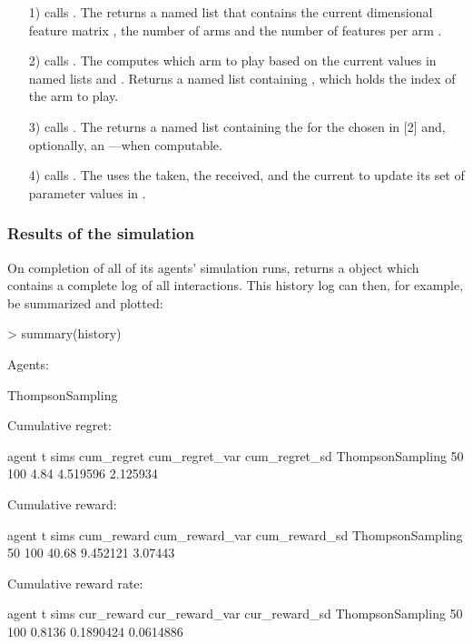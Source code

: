 \documentclass{jss}
\begin{document}
\begin{enumerate}
         \item[1)]  calls . The  returns a named list that contains the current  dimensional feature matrix , the number of arms  and the number of features per arm .
         \item[2)]  calls . The  computes which arm to play based on the current values in named lists  and . Returns a named list containing , which holds the index of the arm to play.
         \item[3)]  calls . The  returns a named list containing the  for the  chosen in [2] and, optionally, an ---when computable.
         \item[4)]  calls . The  uses the  taken, the  received, and the current  to update its set of parameter values in .
\end{enumerate}

\subsubsection{Results of the simulation}

On completion of all of its agents' simulation runs,  returns a  object which contains a complete log of all interactions. This history log can then, for example, be summarized and plotted:

\begin{CodeChunk}
\begin{CodeInput}
> summary(history)
\end{CodeInput}
\begin{CodeOutput}
Agents:

  ThompsonSampling

Cumulative regret:

            agent  t sims cum_regret cum_regret_var cum_regret_sd
 ThompsonSampling 50  100       4.84       4.519596      2.125934


Cumulative reward:

            agent  t sims cum_reward cum_reward_var cum_reward_sd
 ThompsonSampling 50  100      40.68       9.452121       3.07443


Cumulative reward rate:

            agent  t sims cur_reward cur_reward_var cur_reward_sd
 ThompsonSampling 50  100     0.8136      0.1890424     0.0614886
\end{CodeOutput}
\end{CodeChunk}
\end{document}
